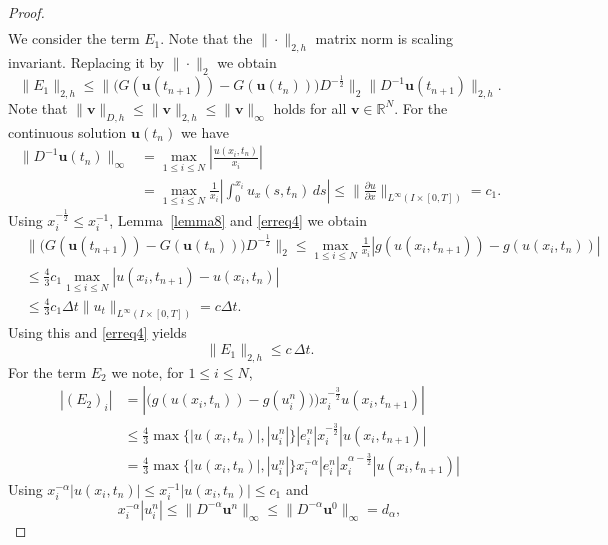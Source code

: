 \documentclass{siamltex}
\newcommand{\R}{\mathbb{R}}
\newcommand{\bu}{\mathbf u}
\newcommand{\bv}{\mathbf v}
\begin{document}
{\begin{proof}
\begin{equation}
\begin{split}
\end{split} \end{equation}
We  consider the term $E_1$. Note that the $\|\cdot\|_{2,h}$ matrix norm is scaling invariant. Replacing it by $\|\cdot\|_2$ we obtain
\[
 \|E_1\|_{2,h} \leq \|\big(G(\bu(t_{n+1}))- G(\bu(t_n))\big)D^{-\frac12}\|_2 \|D^{-1}\bu(t_{n+1})\|_{2,h}.
\]
Note that $\|\bv\|_{D,h}\leq \|\bv\|_{2,h} \leq \|\bv\|_\infty$ holds for all $\bv \in \R^N$. 
For the continuous solution $\bu(t_n)$ we have
\begin{equation} \label{erreq4} \begin{split}
  \|D^{-1}\bu(t_n)\|_{\infty} & = \max_{1 \leq i \leq N} \left| \frac{u(x_i,t_n)}{x_i}\right| \\ & =\max_{1 \leq i \leq N} \frac{1}{x_i} \left|
  \int_0^{x_i} u_x(s,t_n)\, ds\right| \leq \|\frac{\partial u}{\partial  x}\|_{L^\infty(I\times[0,T])}=c_1.
\end{split} \end{equation}
Using $x_i^{-\frac12} \leq x_i^{-1}$,  Lemma~\ref{lemma8} and  \eqref{erreq4} we obtain
\[ \begin{split}
 & \|\big(G(\bu(t_{n+1})) - G(\bu(t_{n}))\big)D^{-\frac12}\|_2  \leq  \max_{1 \leq i \leq N} \frac{1}{x_i} |g(u(x_i,t_{n+1}))-g(u(x_i,t_{n}))| \\ &  \leq \tfrac43 c_1 \max_{1 \leq i \leq N} |u(x_i,t_{n+1})-u(x_i,t_n)| \\ & \leq \tfrac43 c_1 \Delta t \|u_t\|_{L^\infty(I \times [0,T])} = c \Delta t.
\end{split}\]
Using this and \eqref{erreq4} yields
\begin{equation} \label{erreq5}
 \|E_1\|_{2,h} \leq c\, \Delta t.
\end{equation}
For the term $E_2$ we note, for $1 \leq i \leq N$,
\[ \begin{split}
 |(E_2)_i| & =\left| \big(g(u(x_i,t_{n})) - g(u_i^n)\big)\big)x_i^{-\frac32} u(x_i,t_{n+1})\right| \\
 & \leq \tfrac43 \max \{|u(x_i,t_{n})|,|u_i^n|\} |e_i^n| x_i^{-\frac32} |u(x_i,t_{n+1})| 
  \\ &  =\tfrac43 \max \{|u(x_i,t_{n})|,|u_i^n|\} x_i^{-\alpha} |e_i^n| x_i^{\alpha-\frac32} |u(x_i,t_{n+1})| 
\end{split}\]
Using $x_i^{-\alpha}|u(x_i,t_{n})| \leq x_i^{-1}|u(x_i,t_{n})| \leq  c_1$ and 
\begin{equation} \label{newlabel} x_i^{-\alpha} |u_i^n| \leq \|D^{-\alpha} \bu^n\|_\infty \leq \|D^{-\alpha} \bu^0\|_\infty= d_\alpha,
\end{equation}

\end{proof}}
\end{document}
